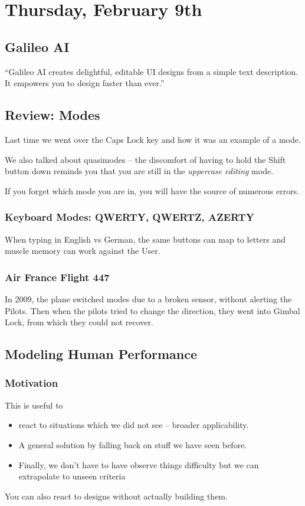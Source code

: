 \section{Thursday, February 9th}
\subsection{Galileo AI}
``Galileo AI creates delightful, editable UI designs from a simple text description. It empowers you to design faster than ever.''

\subsection{Review: Modes}
Last time we went over the Caps Lock key and how it was an example of a mode.

We also talked about quasimodes -- the discomfort of having to hold the Shift button down reminds you that you are still in the \textit{uppercase editing} mode.

\begin{important}
If you forget which mode you are in, you will have the source of numerous errors.
\end{important}

\subsubsection{Keyboard Modes: QWERTY, QWERTZ, AZERTY}
When typing in English vs German, the same buttons can map to letters and muscle memory can work against the User.

\subsubsection{Air France Flight 447}
In 2009, the plane switched modes due to a broken sensor, without alerting the Pilots. Then when the pilots tried to change the direction, they went into Gimbal Lock, from which they could not recover.

\subsection{Modeling Human Performance}
\subsubsection{Motivation}
This is useful to 
\begin{itemize}
    \item react to situations which we did not see -- broader applicability.
    \item A general solution by falling back on stuff we have seen before.
    \item Finally, we don't have to have observe things difficulty but we can extrapolate to unseen criteria
\end{itemize}
You can also react to designs without actually building them.

